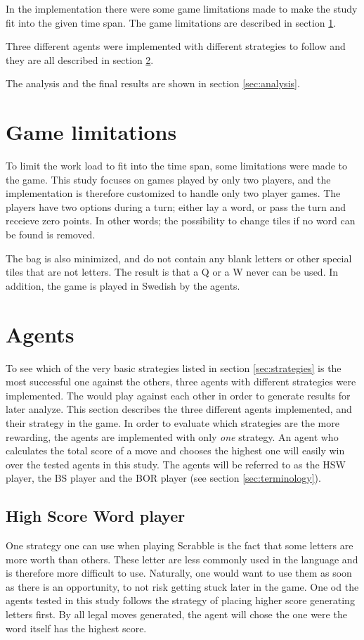 \documentclass[a4paper, 12pt]{report}
\begin{document}
In the implementation there were some game limitations made to make the study fit into the given time span. The game limitations are described in section \ref{sec:limitations}.

Three different agents were implemented with different strategies to follow and they are all described in section \ref{sec:agents}.

The analysis and the final results are shown in section \ref{sec:analysis}.

\section{Game limitations}
\label{sec:limitations}
To limit the work load to fit into the time span, some limitations were made to the game. This study focuses on games played by only two players, and the implementation is therefore customized to handle only two player games. The players have two options during a turn; either lay a word, or pass the turn and receieve zero points. In other words; the possibility to change tiles if no word can be found is removed. 

The bag is also minimized, and do not contain any blank letters or other special tiles that are not letters. The result is that a Q or a W never can be used. In addition, the game is played in Swedish by the agents.

\section{Agents}
\label{sec:agents}
To see which of the very basic strategies listed in section \ref{sec:strategies} is the most successful one against the others, three agents with different strategies were implemented. The would play against each other in order to generate results for later analyze. This section describes the three different agents implemented, and their strategy in the game. In order to evaluate which strategies are the more rewarding, the agents are implemented with only \emph{one} strategy. An agent who calculates the total score of a move and chooses the highest one will easily win over the tested agents in this study. The agents will be referred to as the HSW player, the BS player and the BOR player (see section \ref{sec:terminology}).

\subsection{High Score Word player}
One strategy one can use when playing Scrabble is the fact that some letters are more worth than others. These letter are less commonly used in the language and is therefore more difficult to use. Naturally, one would want to use them as soon as there is an opportunity, to not risk getting stuck later in the game. One od the agents tested in this study follows the strategy of placing higher score generating letters first. By all legal moves generated, the agent will chose the one were the word itself has the highest score. 
\end{document}

